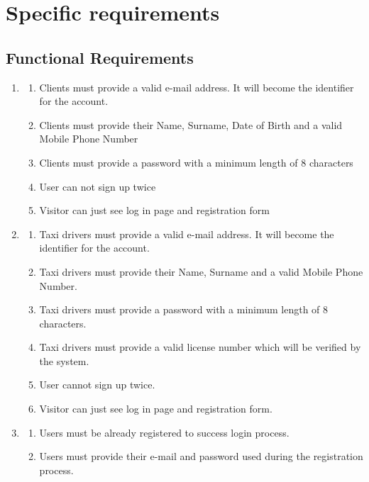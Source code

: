 \documentclass[a4paper]{article}
\begin{document}
\section{Specific requirements}

\subsection{Functional Requirements}

\begin{enumerate}[label=\bfseries G\arabic*:]
    \item
        \begin{enumerate}[label=\bfseries R\arabic*:]
        \item Clients must provide a valid e-mail address. It will become the identifier for the account.
        \item Clients must provide their Name, Surname, Date of Birth and a valid Mobile Phone Number
        \item Clients must provide a password with a minimum length of 8 characters
        \item User can not sign up twice
        \item Visitor can just see log in page and registration form
        \end{enumerate}
    \item
        \begin{enumerate}[label=\bfseries R\arabic*:]
        \item Taxi drivers must provide a valid e-mail address. It will become the identifier for the account.
        \item Taxi drivers must provide their Name, Surname and a valid Mobile Phone Number.
        \item Taxi drivers must provide a password with a minimum length of 8 characters.
        \item Taxi drivers must provide a valid license number which will be verified by the system.
        \item User cannot sign up twice.
        \item Visitor can just see log in page and registration form.
        \end{enumerate}
    \item
        \begin{enumerate}[label=\bfseries R\arabic*:]
        \item Users must be already registered to success login process.
        \item Users must provide their e-mail and password used during the registration process.

\end{enumerate}
\end{enumerate}
\end{document}
